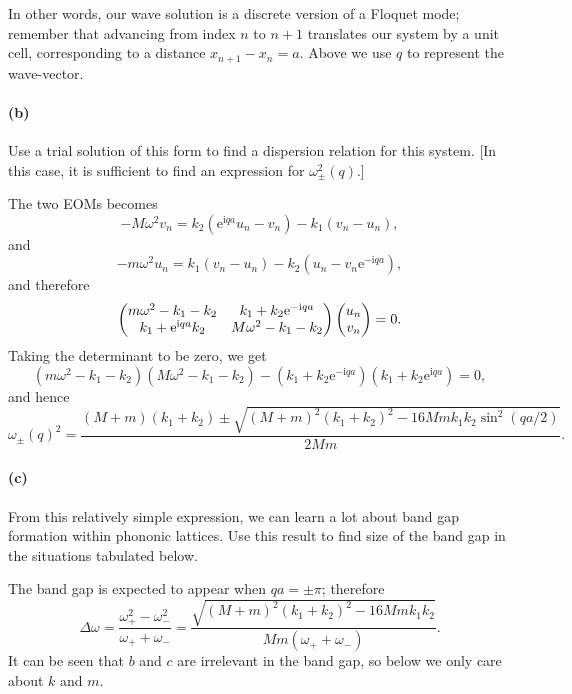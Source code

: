 \documentclass[hyperref, a4paper]{article}
\newcommand*{\ii}{\mathrm{i}}
\newcommand*{\ee}{\mathrm{e}}
\begin{document}
In other words, our wave solution is a discrete version of a Floquet mode; remember that advancing from index $n$ to $n+1$ translates our system by a unit cell, corresponding to a distance $x_{n+1}-x_n=a$. Above we use $q$ to represent the wave-vector.

\paragraph*{(b)} Use a trial solution of this form to find a dispersion relation for this system. [In this case, it is sufficient to find an expression for $\omega_{ \pm}^2(q)$.]

The two EOMs becomes 
\begin{equation}
    - M \omega^2 v_n = k_2 (\ee^{\ii q a} u_n - v_n) - k_1 (v_n - u_n), 
\end{equation}
and 
\begin{equation}
    - m \omega^2 u_n = k_1 (v_n - u_n) - k_2 (u_n - v_n \ee^{- \ii q a}), 
\end{equation}
and therefore 
\begin{equation}
    \pmqty{
        m \omega^2 - k_1 - k_2    & k_1 + k_2 \ee^{- \ii q a} \\
        k_1 + \ee^{\ii q a} k_2   & M \omega^2 - k_1 - k_2 
    } \pmqty{u_n \\ v_n} = 0.
\end{equation}
Taking the determinant to be zero, we get 
\begin{equation}
    (m \omega^2 - k_1 - k_2)(M \omega^2 - k_1 - k_2) - (k_1 + k_2 \ee^{- \ii q a})(k_1 + k_2 \ee^{ \ii q a}) = 0,
\end{equation}
and hence 
\begin{equation}
    \omega_\pm(q)^2 = \frac{
        (M + m)(k_1 + k_2) \pm \sqrt{
            (M+m)^2 (k_1 + k_2)^2 - 16 Mm k_1 k_2 \sin^2 (qa/2)
        }
    }{
        2 Mm
    }.
\end{equation}

\paragraph*{(c)} From this relatively simple expression, we can learn a lot about band gap formation within phononic lattices. Use this result to find size of the band gap in the situations tabulated below.

The band gap is expected to appear when $qa = \pm \pi$;
therefore 
\begin{equation}
    \Delta \omega = \frac{\omega_+^2 - \omega_-^2}{\omega_+ + \omega_-} = 
    \frac{ \sqrt{
        (M+m)^2 (k_1 + k_2)^2 - 16 Mm k_1 k_2 
    }}{Mm (\omega_+ + \omega_-)}.
\end{equation}
It can be seen that $b$ and $c$ are irrelevant in the band gap, 
so below we only care about $k$ and $m$.
\end{document}
